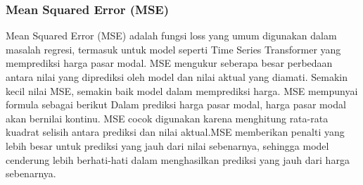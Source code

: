 \subsubsection{Mean Squared Error (MSE)}
Mean Squared Error (MSE) adalah fungsi loss yang umum digunakan dalam masalah regresi, termasuk untuk model seperti Time Series Transformer yang memprediksi harga pasar modal. MSE mengukur seberapa besar perbedaan antara nilai yang diprediksi oleh model dan nilai aktual yang diamati. Semakin kecil nilai MSE, semakin baik model dalam memprediksi harga. MSE mempunyai formula sebagai berikut
Dalam prediksi harga pasar modal, harga pasar modal akan bernilai kontinu. MSE cocok digunakan karena menghitung rata-rata kuadrat selisih antara prediksi dan nilai aktual.MSE memberikan penalti yang lebih besar untuk prediksi yang jauh dari nilai sebenarnya, sehingga model cenderung lebih berhati-hati dalam menghasilkan prediksi yang jauh dari harga sebenarnya.


